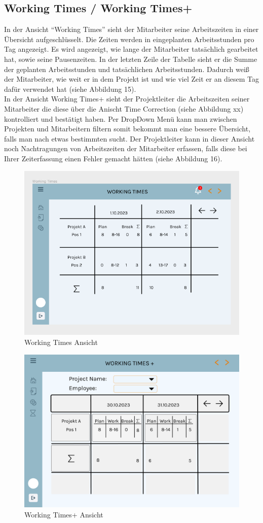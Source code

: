 \documentclass{article}
\begin{document}
\subsection{Working Times / Working Times+}
In der Ansicht “Working Times” sieht der Mitarbeiter seine Arbeitszeiten in
einer Übersicht aufgeschlüsselt. Die Zeiten werden in eingeplanten
Arbeitsstunden pro Tag angezeigt. Es wird angezeigt, wie lange der Mitarbeiter
tatsächlich gearbeitet hat, sowie seine Pausenzeiten. In der letzten Zeile der
Tabelle sieht er die Summe der geplanten Arbeitsstunden und tatsächlichen
Arbeitsstunden. Dadurch weiß der Mitarbeiter, wie weit er in dem Projekt ist
und wie viel Zeit er an diesem Tag dafür verwendet hat (siehe Abbildung 15). \\
In der Ansicht Working Times+ sieht der Projektleiter die Arbeitszeiten 
seiner Mitarbeiter die diese über die Anischt Time Correction (siehe Abbildung xx)
kontrolliert und bestätigt haben. Per DropDown Menü kann man zwischen Projekten und
Mitarbeitern filtern somit bekommt man eine bessere Übersicht, falls man nach etwas
bestimmten sucht. Der Projektleiter kann in dieser Ansicht noch Nachtragungen von
Arbeitszeiten der Mitarbeiter erfassen, falls diese bei Ihrer Zeiterfassung
einen Fehler gemacht hätten (siehe Abbildung 16).


\begin{figure}[]
    \includegraphics[height= 0.5\textwidth,width= \textwidth]{images/Working Times.png}
    \caption{Working Times Ansicht}
    \label{fig:beispiel}
\end{figure}

\begin{figure}[]
    \includegraphics[height= 0.5\textwidth,width= \textwidth]{images/Working Times+.png}
    \caption{Working Times+ Ansicht}
    \label{fig:beispiel}
\end{figure}
\end{document}
